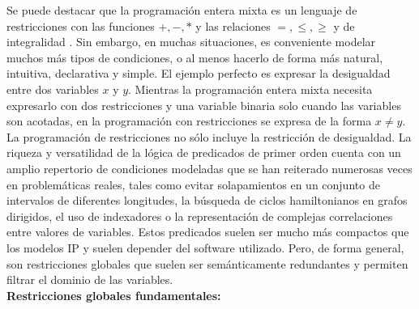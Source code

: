 \documentclass[12pt]{report}
\begin{document}
Se puede destacar que la programación entera mixta es un lenguaje de restricciones con las funciones $+, -, *$ y las relaciones $=,\leq,\geq$ y de integralidad \cite{articulo}. Sin embargo, en muchas situaciones, es conveniente modelar muchos más tipos de condiciones, o al menos hacerlo de forma más natural, intuitiva, declarativa y simple. El ejemplo perfecto es expresar la desigualdad entre dos variables $x$ y $y$. Mientras la programación entera mixta necesita expresarlo con dos restricciones y una variable binaria solo cuando las variables son acotadas, en la programación con restricciones se expresa de la forma $x\neq y$.\\

La programación de restricciones no sólo incluye la restricción de desigualdad. La riqueza y versatilidad de la lógica de predicados de primer orden cuenta con un amplio repertorio de condiciones modeladas que se han reiterado numerosas veces en problemáticas reales, tales como evitar solapamientos en un conjunto de intervalos de diferentes longitudes, la búsqueda de ciclos hamiltonianos en grafos dirigidos, el uso de indexadores o la representación de complejas correlaciones entre valores de variables. Estos predicados suelen ser mucho más compactos que los modelos IP y suelen depender del software utilizado. Pero, de forma general, son restricciones globales que suelen ser semánticamente redundantes y permiten filtrar el dominio de las variables. \\


\textbf{Restricciones globales fundamentales:}\\
\end{document}
